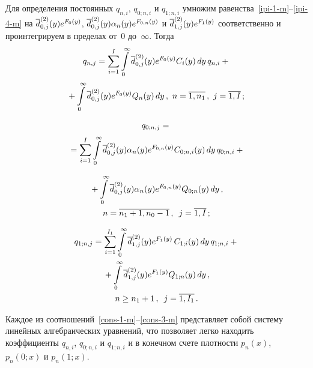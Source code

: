 \begin{multicols}{2}
Для определения постоянных
$q_{n,i}$, $q_{0;n,i}$ и $q_{1;n,i}$
умножим равенства~\eqref{ipi-1-m}--\eqref{ipi-4-m} на
$\overline d^{(2)}_{0,j}(y) e^{F_0(y)}$,
$\overline d^{(2)}_{0,j}(y) \alpha_n(y) e^{F_{0,n}(y)}$
и $\overline d^{(2)}_{1,j}(y) e^{F_{1}(y)}$
соответственно и проинтегрируем в пределах от~0 до~$\infty$.
Тогда
\begin{multline}
\label{cons-1-m}
q_{n,j}= \sum\limits_{i=1}^{I} \int\limits_0^\infty \d^{(2)}_{0,j}(y) 
e^{F_0(y)} C_i(y)\, dy\, q_{n,i}
+{}\\[2pt]
\hspace*{-2mm}{}+
\int\limits_0^\infty \d^{(2)}_{0,j}(y) e^{F_0(y)}  Q_{n}(y)\, dy\,,
\  n=\overline{1,n_1}\,,
\  j=\overline{1,I}\,;\!\!
\end{multline}

\vspace*{-12pt}

\noindent
\begin{multline*}
q_{0;n,j}= {}\\[2pt]
{}=\sum\limits_{i=1}^{I} \int\limits_0^\infty \overline d^{(2)}_{0,j}(y) \alpha_n(y)
e^{F_{0,n}(y)} C_{0;n,i}(y)\, dy\, q_{0;n,i}
+{}
\end{multline*}

\noindent
\begin{multline}
\label{cons-2-m}
{}+
\int\limits_0^\infty \overline d^{(2)}_{0,j}(y) \alpha_n(y) e^{F_{0,n}(y)} Q_{0;n}(y)\, dy\,,\\ 
n=\overline{n_1+1,n_0-1}\,, \enskip j=\overline{1,I}\,;
\end{multline}

\vspace*{-12pt}

\noindent
\begin{multline}
\label{cons-3-m}
q_{1;n,j} = \sum\limits_{i=1}^{I_1} \int\limits_0^\infty \overline d^{(2)}_{1,j}(y) 
e^{F_{1}(y)}\, C_{1;i}(y)\, dy\, q_{1;n,i}
+{}\\
{}+
\int\limits_0^\infty \overline d^{(2)}_{1,j}(y) e^{F_{1}(y)} Q_{1;n}(y)\, dy\,,\\ 
n\ge n_1+1\,, \enskip j=\overline{1,I_1}\,.
\end{multline}

Каждое из соотношений~\eqref{cons-1-m}--\eqref{cons-3-m}
представляет собой систему линейных алгебраических
уравнений, что позволяет легко находить коэффициенты
$q_{n,i}$, $q_{0;n,i}$ и $q_{1;n,i}$ и в конечном
счете плотности $p_n(x)$, $p_n(0;x)$ и $p_n(1;x)$.



\end{multicols}
